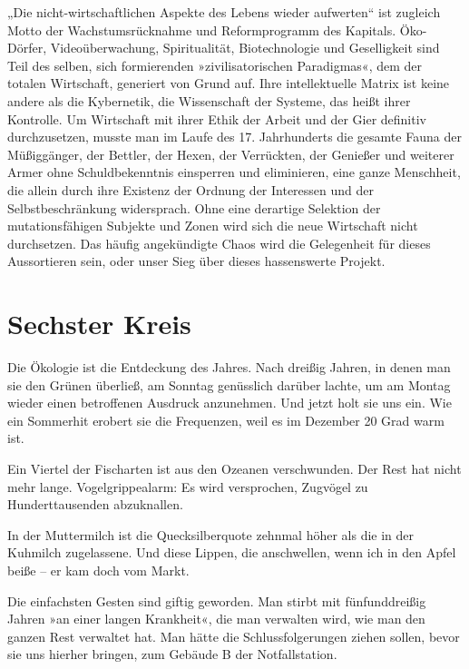 „Die nicht-wirtschaftlichen Aspekte des Lebens wieder aufwerten“
ist zugleich Motto der Wachstumsrücknahme und Reformprogramm des
Kapitals. Öko-Dörfer, Videoüberwachung, Spiritualität,
Biotechnologie und Geselligkeit sind Teil des selben, sich
formierenden »zivilisatorischen Paradigmas«, dem der totalen
Wirtschaft, generiert von Grund auf. Ihre intellektuelle Matrix ist
keine andere als die Kybernetik, die Wissenschaft der Systeme, das
heißt ihrer Kontrolle. Um Wirtschaft mit ihrer Ethik der Arbeit und
der Gier definitiv durchzusetzen, musste man im Laufe des 17.
Jahrhunderts die gesamte Fauna der Müßiggänger, der Bettler, der
Hexen, der Verrückten, der Genießer und weiterer Armer ohne
Schuldbekenntnis einsperren und eliminieren, eine ganze Menschheit,
die allein durch ihre Existenz der Ordnung der Interessen und der
Selbstbeschränkung widersprach. Ohne eine derartige Selektion der
mutationsfähigen Subjekte und Zonen wird sich die neue Wirtschaft
nicht durchsetzen. Das häufig angekündigte Chaos wird die
Gelegenheit für dieses Aussortieren sein, oder unser Sieg über
dieses hassenswerte Projekt.


\section{Sechster Kreis}


Die Ökologie ist die Entdeckung des Jahres. Nach dreißig Jahren, in
denen man sie den Grünen überließ, am Sonntag genüsslich darüber
lachte, um am Montag wieder einen betroffenen Ausdruck anzunehmen.
Und jetzt holt sie uns ein. Wie ein Sommerhit erobert sie die
Frequenzen, weil es im Dezember 20 Grad warm ist.
\extrapar{}

Ein Viertel der Fischarten ist aus den Ozeanen verschwunden. Der
Rest hat nicht mehr lange.
Vogelgrippealarm: Es wird versprochen, Zugvögel zu Hunderttausenden
abzuknallen.

In der Muttermilch ist die Quecksilberquote zehnmal höher als die
in der Kuhmilch zugelassene. Und diese Lippen, die anschwellen,
wenn ich in den Apfel beiße – er kam doch vom Markt.

Die einfachsten Gesten sind giftig geworden. Man stirbt mit
fünfunddreißig Jahren »an einer langen Krankheit«, die man
verwalten wird, wie man den ganzen Rest verwaltet hat. Man hätte
die Schlussfolgerungen ziehen sollen, bevor sie uns hierher
bringen, zum Gebäude B der Notfallstation.

